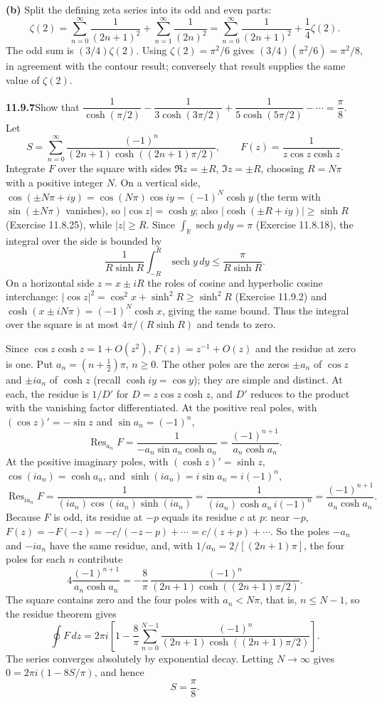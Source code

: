 \textbf{(b)} Split the defining zeta series into its odd and even parts:
\[
\zeta(2)=\sum_{n=0}^{\infty}\frac1{(2n+1)^2}
+\sum_{n=1}^{\infty}\frac1{(2n)^2}
=\sum_{n=0}^{\infty}\frac1{(2n+1)^2}+\frac14\zeta(2).
\]
The odd sum is $(3/4)\zeta(2)$. Using $\zeta(2)=\pi^2/6$
gives $(3/4)(\pi^2/6)=\pi^2/8$, in agreement with the contour result;
conversely that result supplies the same value of $\zeta(2)$.

\par\bigskip
\noindent\textbf{11.9.7}\quad Show that
$\dfrac{1}{\cosh(\pi/2)}-\dfrac{1}{3\cosh(3\pi/2)}
+\dfrac{1}{5\cosh(5\pi/2)}-\cdots=\dfrac{\pi}{8}$.
\solution
Let
\[
S=\sum_{n=0}^{\infty}
\frac{(-1)^n}{(2n+1)\cosh((2n+1)\pi/2)},\qquad
F(z)=\frac1{z\cos z\cosh z}.
\]
Integrate $F$ over the square with sides $\Re z=\pm R$,
$\Im z=\pm R$, choosing $R=N\pi$ with a positive integer $N$.
On a vertical side,
$\cos(\pm N\pi+iy)=\cos(N\pi)\cos iy=(-1)^N\cosh y$ (the term with
$\sin(\pm N\pi)$ vanishes), so $|\cos z|=\cosh y$; also
$|\cosh(\pm R+iy)|\ge\sinh R$ (Exercise 11.8.25), while $|z|\ge R$.
Since $\int_{\mathbb R}\operatorname{sech}y\,dy=\pi$
(Exercise 11.8.18), the integral over the side is bounded by
\[
\frac1{R\sinh R}\int_{-R}^{R}\operatorname{sech}y\,dy
\le\frac{\pi}{R\sinh R}.
\]
On a horizontal side $z=x\pm iR$ the roles of cosine and hyperbolic
cosine interchange: $|\cos z|^2=\cos^2x+\sinh^2R\ge\sinh^2R$
(Exercise 11.9.2) and $\cosh(x\pm iN\pi)=(-1)^N\cosh x$, giving the
same bound. Thus the integral over the square is at most
$4\pi/(R\sinh R)$ and tends to zero.

Since $\cos z\cosh z=1+O(z^2)$, $F(z)=z^{-1}+O(z)$ and the residue at
zero is one. Put $a_n=(n+\tfrac12)\pi$, $n\ge0$. The other poles are
the zeros $\pm a_n$ of $\cos z$ and $\pm ia_n$ of $\cosh z$ (recall
$\cosh iy=\cos y$); they are simple and distinct. At each, the
residue is $1/D'$ for $D=z\cos z\cosh z$, and $D'$ reduces to the
product with the vanishing factor differentiated. At the positive
real poles, with $(\cos z)'=-\sin z$ and $\sin a_n=(-1)^n$,
\[
\operatorname{Res}_{a_n}F
=\frac1{-a_n\sin a_n\cosh a_n}
=\frac{(-1)^{n+1}}{a_n\cosh a_n}.
\]
At the positive imaginary poles, with $(\cosh z)'=\sinh z$,
$\cos(ia_n)=\cosh a_n$, and $\sinh(ia_n)=i\sin a_n=i(-1)^n$,
\[
\operatorname{Res}_{ia_n}F
=\frac1{(ia_n)\cos(ia_n)\sinh(ia_n)}
=\frac1{(ia_n)\cosh a_n\,i(-1)^n}
=\frac{(-1)^{n+1}}{a_n\cosh a_n}.
\]
Because $F$ is odd, its residue at $-p$ equals its residue $c$ at
$p$: near $-p$, $F(z)=-F(-z)=-c/(-z-p)+\cdots=c/(z+p)+\cdots$.
So the poles $-a_n$ and $-ia_n$ have the same residue, and, with
$1/a_n=2/[(2n+1)\pi]$, the four poles for each $n$ contribute
\[
4\frac{(-1)^{n+1}}{a_n\cosh a_n}
=-\frac8\pi\,
\frac{(-1)^n}{(2n+1)\cosh((2n+1)\pi/2)}.
\]
The square contains zero and the four poles with $a_n<N\pi$, that
is, $n\le N-1$, so the residue theorem gives
\[
\oint F\,dz=2\pi i\left[1-\frac8\pi\sum_{n=0}^{N-1}
\frac{(-1)^n}{(2n+1)\cosh((2n+1)\pi/2)}\right].
\]
The series converges absolutely by exponential decay.
Letting $N\to\infty$ gives $0=2\pi i(1-8S/\pi)$, and hence
\[
\boxed{S=\frac{\pi}{8}}.
\]


